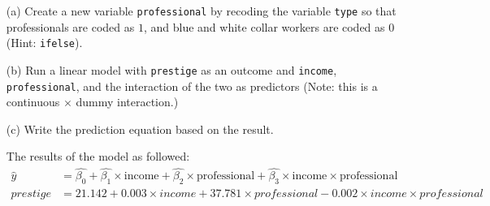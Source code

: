 \documentclass[12pt,letterpaper]{article}
\begin{document}
\newpage
\begin{enumerate}
	
	\item [(a)]
	Create a new variable \texttt{professional} by recoding the variable \texttt{type} so that professionals are coded as $1$, and blue and white collar workers are coded as $0$ (Hint: \texttt{ifelse}).
	
	\vspace{.15cm}
	
						
	
	\item [(b)]
	Run a linear model with \texttt{prestige} as an outcome and \texttt{income}, \texttt{professional}, and the interaction of the two as predictors (Note: this is a continuous $\times$ dummy interaction.)
	
	\vspace{.15cm}
	
							

	\item [(c)]
	Write the prediction equation based on the result.
	
	 \noindent The results of the model as followed: %
	 \begin{align*}
	 	\hat{y} &= \hat{\beta_0} + \hat{\beta_1} \times  \text{income} +  \hat{\beta_2} \times  \text{professional} +  \hat{\beta_3} \times  \text{income} \times \text{professional}\\
	 	prestige &= 21.142 + 0.003 \times {income} + 37.781 \times {professional} - 0.002 \times {income} \times{professional}
	 \end{align*}
	 

\end{enumerate}
\end{document}
